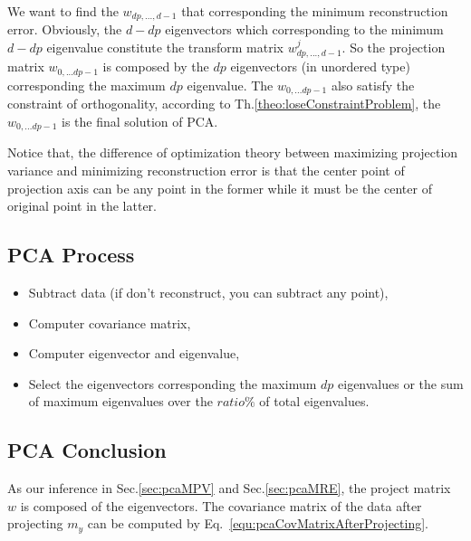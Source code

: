 \documentclass[runningheads,openany]{xhlPaper}
\begin{document}
We want to find the $w_{dp,...,d - 1}$ that corresponding the minimum reconstruction error. Obviously, the $d - dp$ eigenvectors which corresponding to the minimum $d - dp$ eigenvalue constitute the transform matrix $w^j_{dp,...,d - 1}$. So the projection matrix $w_{0,...dp - 1}$ is composed by the $dp$ eigenvectors (in unordered type) corresponding the maximum $dp$ eigenvalue. The $w_{0,...dp - 1}$ also satisfy the constraint of orthogonality, according to Th.\ref{theo:loseConstraintProblem}, the $w_{0,...dp - 1}$ is the final solution of PCA.  

Notice that, the difference of optimization theory between maximizing projection variance and minimizing reconstruction error is that the center point of projection axis can be any point in the former while it must be the center of original point in the latter. 

\subsection{PCA Process}
\begin{itemize}
  \item Subtract data (if don't reconstruct, you can subtract any point),
  \item Computer covariance matrix,
  \item Computer eigenvector and eigenvalue,
  \item Select the eigenvectors corresponding the maximum $dp$ eigenvalues or the sum of maximum eigenvalues over the $ratio\%$ of total eigenvalues.
\end{itemize}

\subsection{PCA Conclusion}
As our inference in Sec.\ref{sec:pcaMPV} and Sec.\ref{sec:pcaMRE}, the project matrix $w$ is composed of the eigenvectors. The covariance matrix of the data after projecting $m_y$ can be computed by Eq.~\ref{equ:pcaCovMatrixAfterProjecting}.
\end{document}
